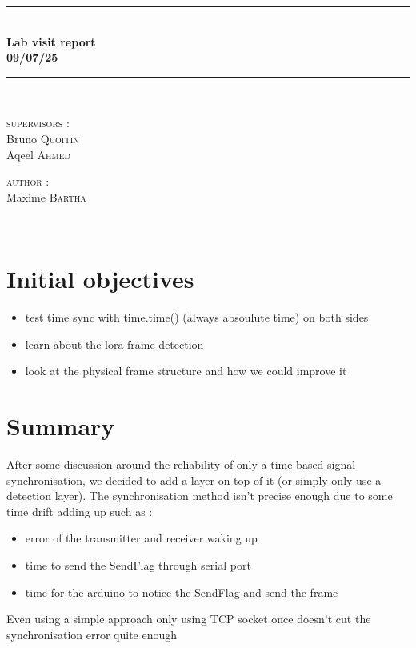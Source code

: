 \documentclass[a4paper, 12pt]{article}
\newcommand{\HRule}{\rule{\linewidth}{0.3mm}}
\begin{document}
\begin{center}
\HRule \\[0.3cm]
{ \LARGE \bfseries Lab visit report \\[0.3cm]}
{ \LARGE \bfseries 09/07/25 \\[0.1cm]} %
\HRule \\[1.5cm]

\begin{minipage}[t]{0.45\textwidth}
\begin{flushleft} \large
\textsc{supervisors :}\\
Bruno \textsc{Quoitin}\\
Aqeel \textsc{Ahmed}\\
\end{flushleft}

\end{minipage}
\begin{minipage}[t]{0.45\textwidth}
\begin{flushright} \large
\textsc{author :}\\
Maxime \textsc{Bartha}\\
\end{flushright}
\end{minipage}\\[2ex]
\end{center}


\section{Initial objectives}
\begin{itemize}
  \item test time sync with time.time() (always absoulute time) on both sides
  \item learn about the lora frame detection 
  \item look at the physical frame structure and how we could improve it 
\end{itemize}

\section{Summary}
After some discussion around the reliability of only a time based signal synchronisation, we decided to add a layer on top of it (or simply only use a detection layer).
The synchronisation method isn't precise enough due to some time drift adding up such as : 
\begin{itemize}
  \item error of the transmitter and receiver waking up
  \item time to send the SendFlag through serial port
  \item time for the arduino to notice the SendFlag and send the frame
\end{itemize}
Even using a simple approach only using TCP socket once doesn't cut the synchronisation error quite enough 
\end{document}

